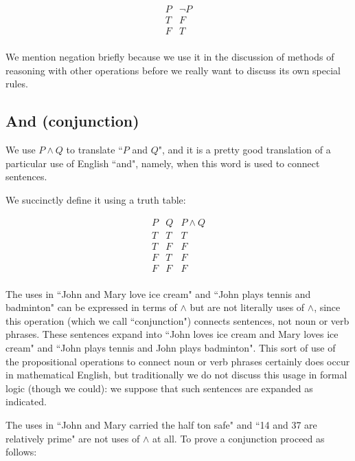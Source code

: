 \documentclass[12pt]{article}
\begin{document}
$$\begin{array}{c|c}

P & \neg P \\ \hline
T & F \\
F & T \\
\end{array}$$

We mention negation briefly because we use it in the discussion of methods of reasoning with other operations before we really want to discuss its own special rules.

\subsection{And (conjunction)}

We use $P \wedge Q$ to translate ``$P$ and $Q$", and it is a pretty good translation of a particular use of English ``and", namely, when this word is used to connect sentences.

We succinctly define it using a truth table:

$$\begin{array}{cc|c}
P & Q & P \wedge Q \\ \hline
T & T & T \\
T & F & F \\
F & T & F \\
F & F & F \\
\end{array}$$

The uses in ``John and Mary love ice cream" and ``John plays tennis and badminton" can be expressed in terms of $\wedge$ but are not literally uses of $\wedge$, since this operation (which we call ``conjunction") connects sentences, not noun or verb phrases.  These sentences expand into ``John loves ice cream and Mary loves ice cream" and ``John plays tennis and John plays badminton".  This sort of use of the propositional operations to connect noun or verb phrases certainly does occur in mathematical English, but traditionally we do not discuss this usage in formal logic (though we could):  we suppose that such sentences are expanded as indicated.

The uses in ``John and Mary carried the half ton safe" and ``14 and 37 are relatively prime" are not uses of $\wedge$ at all.
\newpage
To prove a conjunction proceed as follows:
\end{document}
